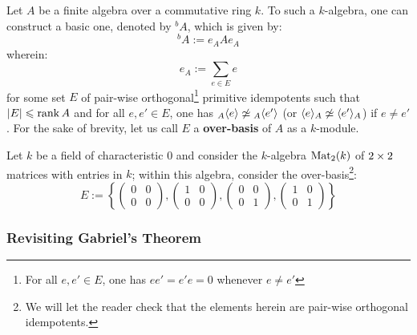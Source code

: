             \begin{definition} \label{def: associative_basic_algebras}
                Let $A$ be a finite algebra over a commutative ring $k$. To such a $k$-algebra, one can construct a basic one, denoted by ${}^bA$, which is given by:
                    $${}^bA := e_A A e_A$$
                wherein:
                    $$e_A := \sum_{e \in E} e$$
                for some set $E$ of pair-wise orthogonal\footnote{For all $e, e' \in E$, one has $ee' = e'e = 0$ whenever $e \not = e'$} primitive idempotents such that $|E| \leqslant \operatorname{rank} A$ and for all $e, e' \in E$, one has ${}_A\langle e\rangle \not \simeq {}_A\langle e'\rangle$ (or $\langle e\rangle_A \not \simeq \langle e'\rangle_A$) if $e \not = e'$. For the sake of brevity, let us call $E$ a \textbf{over-basis} of $A$ as a $k$-module.
            \end{definition}
            \begin{example}
                Let $k$ be a field of characteristic $0$ and consider the $k$-algebra $\mathrm{Mat}_2(k)$ of $2 \x 2$ matrices with entries in $k$; within this algebra, consider the over-basis\footnote{We will let the reader check that the elements herein are pair-wise orthogonal idempotents.}:
                    $$E := \left\{ \begin{pmatrix} 0 & 0 \\ 0 & 0 \end{pmatrix}, \begin{pmatrix} 1 & 0 \\ 0 & 0 \end{pmatrix}, \begin{pmatrix} 0 & 0 \\ 0 & 1 \end{pmatrix}, \begin{pmatrix} 1 & 0 \\ 0 & 1 \end{pmatrix} \right\}$$
                
            \end{example}
            
        \subsubsection{Revisiting Gabriel's Theorem}